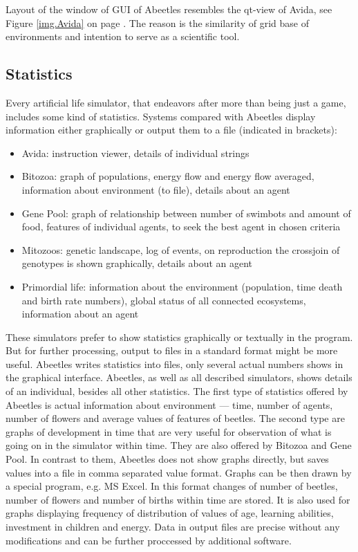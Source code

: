 \documentclass[a4paper,12pt]{report}
\begin{document}
Layout of the window of GUI of Abeetles resembles the qt-view of Avida,  see Figure \ref{img.Avida} on page \pageref{img.Avida} . The reason is the similarity of grid base of environments and intention to serve as a scientific tool.

 
\subsection {Statistics}

Every artificial life simulator, that endeavors after more than being just a game, includes some kind of statistics. 
Systems compared with Abeetles display information either graphically or output them to a file (indicated in brackets):

\begin{itemize}
\item Avida: instruction viewer, details of individual strings 
\item Bitozoa: graph of populations, energy flow and energy flow averaged, information about environment (to file), details about an agent
 \item Gene Pool: graph of relationship between number of swimbots and amount of food, features of individual agents, to seek the best agent in chosen criteria
\item Mitozoos: genetic landscape, log of events, on reproduction the crossjoin of genotypes is shown graphically, details about an agent
\item Primordial life: information about the environment (population, time death and birth rate numbers), global status of all connected ecosystems, information about an agent
\end {itemize}


These simulators prefer to show statistics graphically or textually in the program. But for further processing, output to files in a standard format might be more useful. Abeetles writes statistics into files, only several actual numbers shows in the graphical interface. Abeetles, as well as all described simulators, shows details of an individual, besides all other statistics. The first type of statistics offered by Abeetles is actual information about environment --- time, number of agents, number of flowers and average values of features of beetles. The second type are graphs of development in time that are very useful for observation of what is going on in the simulator within time. They are also offered by Bitozoa and Gene Pool. In contrast to them, Abeetles does not show graphs directly, but saves values into a file in comma separated value format. Graphs can be then drawn by a special program, e.g. MS Excel. In this format changes of number of beetles, number of flowers and number of births within time are stored. It is also used for graphs displaying frequency of distribution of values of age, learning abilities, investment in children and energy. Data in output files are precise without any modifications and can be  further proccessed by additional software.
\end{document}
